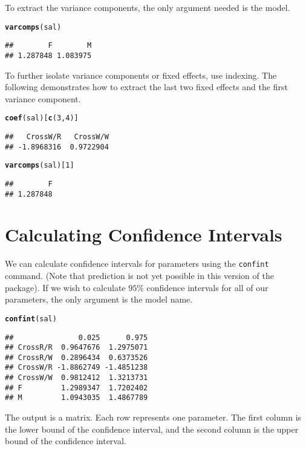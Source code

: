 \documentclass[11pt]{article}\usepackage[]{graphicx}\usepackage[]{color}
\makeatletter
\newcommand{\hlnum}[1]{\textcolor[rgb]{0.686,0.059,0.569}{#1}}%
\newcommand{\hlstd}[1]{\textcolor[rgb]{0.345,0.345,0.345}{#1}}%
\newcommand{\hlkwd}[1]{\textcolor[rgb]{0.737,0.353,0.396}{\textbf{#1}}}%
\newenvironment{kframe}{%
 \def\at@end@of@kframe{}%
 \ifinner\ifhmode%
  \def\at@end@of@kframe{\end{minipage}}%
  \begin{minipage}{\columnwidth}%
 \fi\fi%
 \def\FrameCommand##1{\hskip\@totalleftmargin \hskip-\fboxsep
 \colorbox{shadecolor}{##1}\hskip-\fboxsep
     \hskip-\linewidth \hskip-\@totalleftmargin \hskip\columnwidth}%
 \MakeFramed {\advance\hsize-\width
   \@totalleftmargin\z@ \linewidth\hsize
   \@setminipage}}%
 {\par\unskip\endMakeFramed%
 \at@end@of@kframe}
\newenvironment{knitrout}{}{} %
\makeatother
\begin{document}
To extract the variance components, the only argument needed is the model. 
\begin{knitrout}
\color{fgcolor}\begin{kframe}
\begin{alltt}
\hlkwd{varcomps}\hlstd{(sal)}
\end{alltt}
\begin{verbatim}
##        F        M 
## 1.287848 1.083975
\end{verbatim}
\end{kframe}
\end{knitrout}

To further isolate variance components or fixed effects, use indexing. The following demonstrates how to extract the last two fixed effects and the first variance component.
\begin{knitrout}
\color{fgcolor}\begin{kframe}
\begin{alltt}
\hlkwd{coef}\hlstd{(sal)[}\hlkwd{c}\hlstd{(}\hlnum{3}\hlstd{,}\hlnum{4}\hlstd{)]}
\end{alltt}
\begin{verbatim}
##   CrossW/R   CrossW/W 
## -1.8968316  0.9722904
\end{verbatim}
\begin{alltt}
\hlkwd{varcomps}\hlstd{(sal)[}\hlnum{1}\hlstd{]}
\end{alltt}
\begin{verbatim}
##        F 
## 1.287848
\end{verbatim}
\end{kframe}
\end{knitrout}

\section{Calculating Confidence Intervals}\label{sec:ci}
We can calculate confidence intervals for parameters using the \texttt{confint} command. (Note that prediction is not yet possible in this version of the package).  If we wish to calculate $95\%$ confidence intervals for all of our parameters, the only argument is the model name. 
\begin{knitrout}
\color{fgcolor}\begin{kframe}
\begin{alltt}
\hlkwd{confint}\hlstd{(sal)}
\end{alltt}
\begin{verbatim}
##               0.025      0.975
## CrossR/R  0.9647676  1.2975071
## CrossR/W  0.2896434  0.6373526
## CrossW/R -1.8862749 -1.4851238
## CrossW/W  0.9812412  1.3213731
## F         1.2989347  1.7202402
## M         1.0943035  1.4867789
\end{verbatim}
\end{kframe}
\end{knitrout}
The output is a matrix. Each row represents one parameter. The first column is the lower bound of the confidence interval, and the second column is the upper bound of the confidence interval. \\
\end{document}
